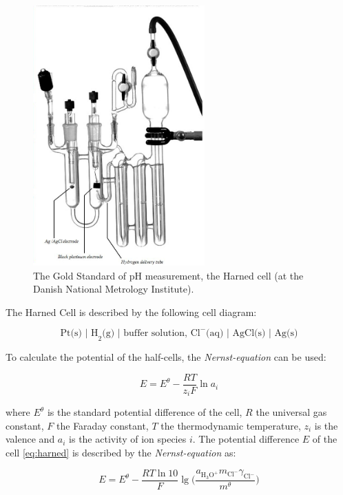 \begin{figure}
\centering
\includegraphics[height=10cm, keepaspectratio]{img/theory/Harned_bw.jpg}
\caption{The Gold Standard of pH measurement, the Harned cell (at the Danish National Metrology Institute).}
\label{fig:harned}
\end{figure}

The Harned Cell is described by the following cell diagram: 

\begin{equation}
\textrm{Pt(s) | H}_2\textrm{(g) | buffer solution, Cl}^-\textrm{(aq) | AgCl(s) | Ag(s)}
\label{eq:harned}
\end{equation}

To calculate the potential of the half-cells, the \emph{Nernst-equation} can be used:

\begin{equation}
E = E^\theta - \frac{RT}{z_iF}\ln a_i
\end{equation}

where $E^\theta$ is the standard potential difference of the cell, $R$ the universal gas constant, $F$ the Faraday constant, $T$ the thermodynamic temperature, $z_i$ is the valence and $a_i$ is the activity of ion species $i$.
The potential difference $E$ of the cell \ref{eq:harned} is described by the \emph{Nernst-equation} as:

\begin{equation}
E = E^\theta - \frac{RT\ln 10}{F}\lg\bigg(\frac{a_{\textrm{H}_3\textrm{O}^+}m_{\textrm{Cl}^-}\gamma_{\textrm{Cl}^-}}{m^\theta}\bigg)
\end{equation}

